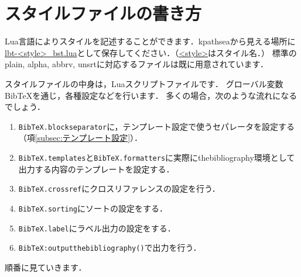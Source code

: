 \documentclass[a4paper]{ltjsarticle}
\newcommand{\luafunc}[1]{\texttt{#1}}
\newcommand*{\luavar}[1]{\texttt{#1}}
\begin{document}
\section{スタイルファイルの書き方}
Lua言語によりスタイルを記述することができます．kpathseaから見える場所に\url{lbt-<style>_bst.lua}として保存してください．（\url{<style>}はスタイル名．）
標準のplain, alpha, abbrv, unsrtに対応するファイルは既に用意されています．

スタイルファイルの中身は，Luaスクリプトファイルです．
グローバル変数BibTeXを通じ，各種設定などを行います．
多くの場合，次のような流れになるでしょう．
\begin{enumerate}
\item \luavar{BibTeX.blockseparator}に，テンプレート設定で使うセパレータを設定する（項\ref{subsec:テンプレート設定}）．
\item \luavar{BibTeX.templates}と\luavar{BibTeX.formatters}に実際にthebibliography環境として出力する内容のテンプレートを設定する．
\item \luavar{BibTeX.crossref}にクロスリファレンスの設定を行う．
\item \luavar{BibTeX.sorting}にソートの設定をする．
\item \luavar{BibTeX.label}にラベル出力の設定をする．
\item \luafunc{BibTeX:outputthebibliography()}で出力を行う．
\end{enumerate}
順番に見ていきます．


%
%
%
%
%
%
\end{document}

